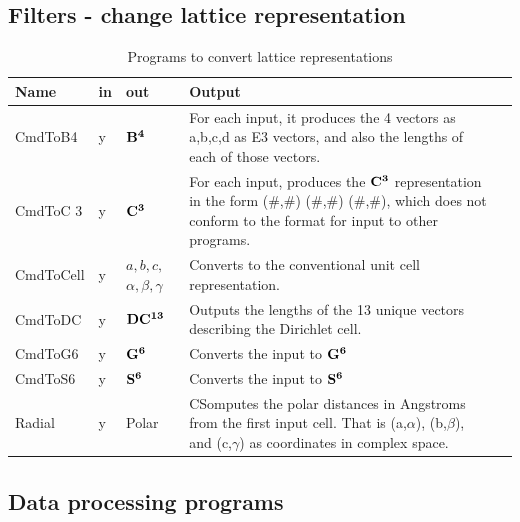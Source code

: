 \documentclass[preprint]{iucr}              %
\numberwithin{equation}{section}
\newcommand{\BIV}[0]{$\bf{B^{4}}$}
\newcommand{\SVI}[0]{$\bf{S^{6}}$}
\newcommand{\GVI}[0]{$\bf{G^{6}}$}
\newcommand{\CIII}[0]{$\bf{C^{3}}$}
\newcommand{\DXIII}[0]{$\bf{DC^{13}}$}
\begin{document}
	\subsection{Filters - change lattice representation}
	
	\begin{table}
		\renewcommand{\arraystretch}{1.2}
		\caption{Programs to convert lattice representations}
		\begin{tabular}{l l l p{}  l}
			\toprule
			Name		&	in	&	out			& Output	\\
			\midrule
			CmdToB4		&	y	&	\BIV{}		&		For each input, 
			it produces the 4 vectors as a,b,c,d as E3 vectors, 
			and also the lengths of each of those vectors.\\[.9pt]
			CmdToC	3	&	y	&	\CIII{	}	&		
			For each input, produces the \CIII{} representation in the form 
			(\#,\#) (\#,\#) (\#,\#), 
			which does not conform to the format for input to other programs.\\[.9pt]
			CmdToCell	&	y	&	
			\parbox[t]{0.07\textwidth}{${	a,b,c,}$ \\ ${\alpha,\beta,\gamma}$}		&		
			Converts to the conventional unit cell representation.\\[.9pt]
			CmdToDC		&	y	&	\DXIII{}		&	Outputs the lengths of the 13 unique vectors describing the Dirichlet cell.\\[.9pt]			
			CmdToG6		&	y	&	\GVI{}		&		Converts the input to \GVI{}\\[.9pt]
			CmdToS6		&	y	&	\SVI{}		&		Converts the input to \SVI{}\\[.9pt]
			Radial		&	y	&	Polar	&
				CSomputes the polar distances in Angstroms 
				from the first input cell. 
				That is {(a,$\alpha$)}, {(b,$\beta$)}, and {(c,$\gamma$)} 
				as coordinates in complex space.\\[.9pt]
			\bottomrule
			
		\end{tabular}
	\end{table}

\subsection{Data processing programs}
\end{document}

